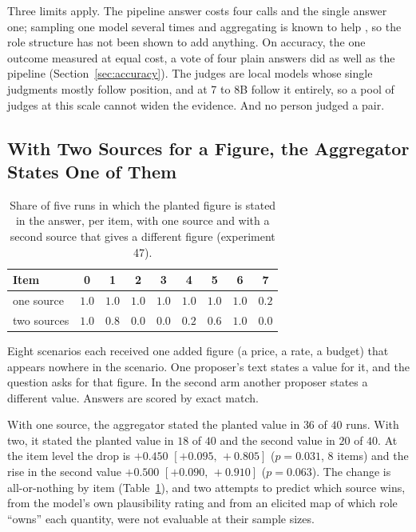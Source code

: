 \documentclass[10pt,twocolumn]{article}
\newcommand{\ci}[2]{\ensuremath{[#1,\,#2]}}
\begin{document}
Three limits apply. The pipeline answer costs four calls and the single
answer one; sampling one model several times and aggregating is known
to help \cite{li2025selfmoa,li2024moreagents}, so the role structure
has not been shown to add anything. On accuracy, the one outcome
measured at equal cost, a vote of four plain answers did as well as the
pipeline (Section~\ref{sec:accuracy}). The judges are local models whose
single judgments mostly follow position, and at 7 to 8B follow it
entirely, so a pool of judges at this scale cannot widen the evidence.
And no person judged a pair.

\subsection{With Two Sources for a Figure, the Aggregator States One of Them}
\label{sec:select}

\begin{table}[t]
\centering\footnotesize
\setlength{\tabcolsep}{2.2pt}
\begin{tabular}{lcccccccc}
\toprule
Item & 0 & 1 & 2 & 3 & 4 & 5 & 6 & 7 \\
\midrule
one source & $1.0$ & $1.0$ & $1.0$ & $1.0$ & $1.0$ & $1.0$ & $1.0$ & $0.2$ \\
two sources & $1.0$ & $0.8$ & $0.0$ & $0.0$ & $0.2$ & $0.6$ & $1.0$ & $0.0$ \\
\bottomrule
\end{tabular}
\caption{Share of five runs in which the planted figure is stated in
the answer, per item, with one source and with a second source that
gives a different figure (experiment 47).}
\label{tab:items}
\end{table}

Eight scenarios each received one added figure (a price, a rate, a
budget) that appears nowhere in the scenario. One proposer's text
states a value for it, and the question asks for that figure. In the
second arm another proposer states a different value. Answers are
scored by exact match.

With one source, the aggregator stated the planted value in $36$ of
$40$ runs. With two, it stated the planted value in $18$ of $40$ and
the second value in $20$ of $40$. At the item level the drop is
$+0.450$ \ci{+0.095}{+0.805} ($p=0.031$, 8 items) and the rise in the
second value $+0.500$ \ci{+0.090}{+0.910} ($p=0.063$). The change is
all-or-nothing by item (Table~\ref{tab:items}), and two attempts to
predict which source wins, from the model's own plausibility rating and
from an elicited map of which role ``owns'' each quantity, were not
evaluable at their sample sizes.
\end{document}
